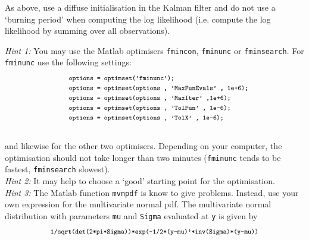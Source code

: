 \documentclass[12pt, a4paper]{article}
\begin{document}
As above, use a diffuse initialisation in the Kalman filter and do not use a `burning period' when computing the log likelihood (i.e. compute the log likelihood by summing over all observations).

\bigskip

\noindent \emph{Hint 1:} You may use the Matlab optimisers \texttt{fmincon}, \texttt{fminunc} or \texttt{fminsearch}. For \texttt{fminunc} use the following settings:
\\
\hspace{1cm}
\begin{equation*}
\begin{array}{cl}
&\footnotesize \texttt{options  =  optimset('fminunc');}\\

&\footnotesize\texttt{options  =  optimset(options , 'MaxFunEvals' , 1e+6);}\\

&\footnotesize\texttt{options  =  optimset(options , 'MaxIter'      ,1e+6);}\\

&\footnotesize \texttt{options  =  optimset(options , 'TolFun'      , 1e-6);}\\

&\footnotesize \texttt{options  =  optimset(options , 'TolX'        , 1e-6);}\\
\end{array}
\end{equation*}
\\
\noindent and likewise for the other two optimisers. Depending on your computer, the optimisation should not take longer than two minutes (\texttt{fminunc} tends to be fastest, \texttt{fminsearch} slowest). 
\\

\noindent \emph{Hint 2:} It may help to choose a `good' starting point for the optimisation. 
\\

\noindent \emph{Hint 3:} The Matlab function \texttt{mvnpdf} is know to give problems. Instead, use your own expression for the multivariate normal pdf. The multivariate normal distribution with parameters \texttt{mu} and \texttt{Sigma} evaluated at \texttt{y} is given by 
\\
\begin{equation*}
\begin{array}{c}
\footnotesize\texttt{1/sqrt(det(2*pi*Sigma))*exp(-1/2*(y-mu)'*inv(Sigma)*(y-mu))} 
\end{array}
\end{equation*}
\end{document}
